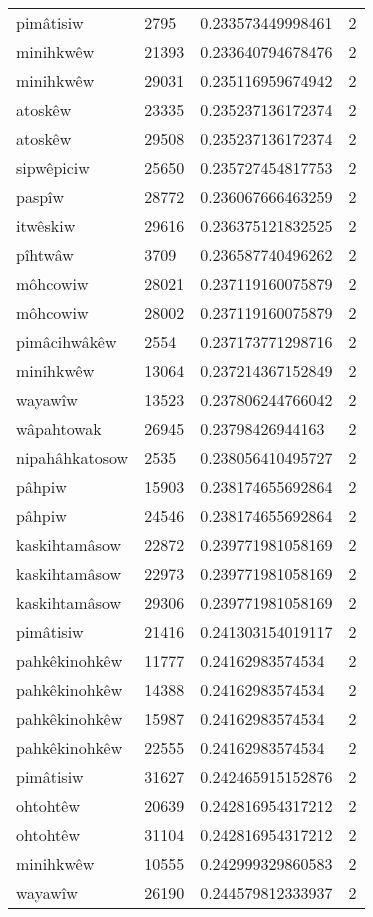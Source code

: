 \begin{longtable}{llll}
pimâtisiw & 2795 & 0.233573449998461 & 2 \\
minihkwêw & 21393 & 0.233640794678476 & 2 \\
minihkwêw & 29031 & 0.235116959674942 & 2 \\
atoskêw & 23335 & 0.235237136172374 & 2 \\
atoskêw & 29508 & 0.235237136172374 & 2 \\
sipwêpiciw & 25650 & 0.235727454817753 & 2 \\
paspîw & 28772 & 0.236067666463259 & 2 \\
itwêskiw & 29616 & 0.236375121832525 & 2 \\
pîhtwâw & 3709 & 0.236587740496262 & 2 \\
môhcowiw & 28021 & 0.237119160075879 & 2 \\
môhcowiw & 28002 & 0.237119160075879 & 2 \\
pimâcihwâkêw & 2554 & 0.237173771298716 & 2 \\
minihkwêw & 13064 & 0.237214367152849 & 2 \\
wayawîw & 13523 & 0.237806244766042 & 2 \\
wâpahtowak & 26945 & 0.23798426944163 & 2 \\
nipahâhkatosow & 2535 & 0.238056410495727 & 2 \\
pâhpiw & 15903 & 0.238174655692864 & 2 \\
pâhpiw & 24546 & 0.238174655692864 & 2 \\
kaskihtamâsow & 22872 & 0.239771981058169 & 2 \\
kaskihtamâsow & 22973 & 0.239771981058169 & 2 \\
kaskihtamâsow & 29306 & 0.239771981058169 & 2 \\
pimâtisiw & 21416 & 0.241303154019117 & 2 \\
pahkêkinohkêw & 11777 & 0.24162983574534 & 2 \\
pahkêkinohkêw & 14388 & 0.24162983574534 & 2 \\
pahkêkinohkêw & 15987 & 0.24162983574534 & 2 \\
pahkêkinohkêw & 22555 & 0.24162983574534 & 2 \\
pimâtisiw & 31627 & 0.242465915152876 & 2 \\
ohtohtêw & 20639 & 0.242816954317212 & 2 \\
ohtohtêw & 31104 & 0.242816954317212 & 2 \\
minihkwêw & 10555 & 0.242999329860583 & 2 \\
wayawîw & 26190 & 0.244579812333937 & 2 \\

\end{longtable}
